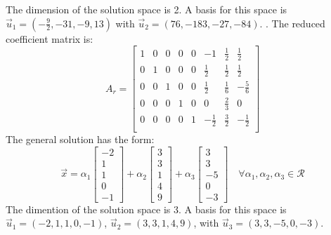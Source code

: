 \documentclass[11pt]{homework}
\begin{document}
The dimension of the solution space is 2.
A basis for this space is
$\vec u_1 = ( -\frac{9}{2} , -31 , -9 , 13)$ with
$\vec u_2 = ( 76 , -183 , -27 , -84 )$.
\newline
{}.
The reduced coefficient matrix is:
\begin{equation*}
A_r = 
  \begin{bmatrix}
  1 & 0 & 0 & 0 & 0 & -1          & \frac{1}{2} & \frac{1}{2} \\
  0 & 1 & 0 & 0 & 0 & \frac{1}{2} & \frac{1}{2} & \frac{1}{2} \\
  0 & 0 & 1 & 0 & 0 & \frac{1}{2} & \frac{1}{6} & -\frac{5}{6} \\
  0 & 0 & 0 & 1 & 0 & 0           & \frac{2}{3} & 0 \\
  0 & 0 & 0 & 0 & 1 & -\frac{1}{2} & \frac{3}{2} & -\frac{1}{2} \\
  \end{bmatrix}
\end{equation*}
The general solution has the form:
\begin{equation*}
\vec x = \alpha_1
  \begin{bmatrix}
  -2 \\
  1 \\
  1 \\
  0 \\
  -1
  \end{bmatrix}
  + \alpha_2 
  \begin{bmatrix}
  3 \\
  3 \\
  1 \\
  4 \\
  9
  \end{bmatrix}
  +\alpha_3 
  \begin{bmatrix}
  3 \\
  3 \\
  -5 \\
  0 \\
  -3
  \end{bmatrix}
\quad \forall \alpha_1 , \alpha_2 ,\alpha_3 \in \mathcal{R}
\end{equation*}
The dimention of the solution space is 3.
A basis for this space is 
$\vec u_1 =( -2 , 1 , 1 , 0 , -1)$,
$\vec u_2 =( 3 , 3 , 1 , 4 , 9)$, with
$\vec u_3 =( 3 , 3 , -5 , 0 , -3)$.
\end{document}
